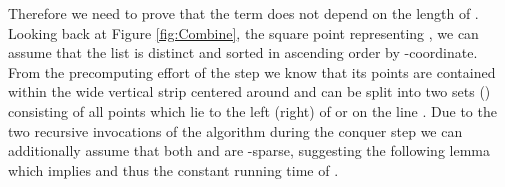 \begin{isabellebody}
\begin{isamarkuptext}
\begin{lemma}
\end{lemma}

Therefore we need to prove that the term   does not depend
on the length of . Looking back at Figure \ref{fig:Combine}, the square point representing ,
we can assume that the list  is distinct and sorted in ascending order by -coordinate.
From the precomputing effort of the  step we know that its points are contained
within the  wide vertical strip centered around  and can be split into two sets 
() consisting of all points which lie to the left (right) of or on the line .
Due to the two recursive invocations of the algorithm during the conquer step we can additionally assume
that both  and  are \isa{{\isasymdelta}}-sparse, suggesting the following lemma which implies
 and thus the constant running time of .


\end{isamarkuptext}
\end{isabellebody}

